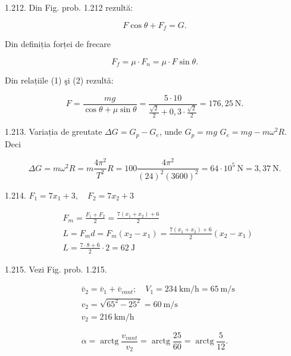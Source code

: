 \documentclass[10pt]{article}
\begin{document}
1.212. Din Fig. prob. 1.212 rezultă:


\begin{equation*}
F \cos \theta+F_{f}=G . \tag{1}
\end{equation*}


Din definiția forței de frecare


\begin{equation*}
F_{f}=\mu \cdot F_{n}=\mu \cdot F \sin \theta . \tag{2}
\end{equation*}


Din relațiile (1) şi (2) rezultă:

$$
F=\frac{m g}{\cos \theta+\mu \sin \theta}=\frac{5 \cdot 10}{\frac{\sqrt{2}}{2}+0,3 \cdot \frac{\sqrt{2}}{2}}=176,25 \mathrm{~N} .
$$

1.213. Variația de greutate $\Delta G=G_{p}-G_{e}$, unde $G_{p}=m g$ $G_{e}=m g-m \omega^{2} R$. Deci

$$
\Delta G=m \omega^{2} R=m \frac{4 \pi^{2}}{T^{2}} R=100 \frac{4 \pi^{2}}{(24)^{2}(3600)^{2}}=64 \cdot 10^{5} \mathrm{~N}=3,37 \mathrm{~N} .
$$

1.214. $F_{1}=7 x_{1}+3, \quad F_{2}=7 x_{2}+3$

$$
\begin{aligned}
& F_{m}=\frac{F_{1}+F_{2}}{2}=\frac{7\left(x_{1}+x_{2}\right)+6}{2} \\
& L=F_{m} d=F_{m}\left(x_{2}-x_{1}\right)=\frac{7\left(x_{1}+x_{2}\right)+6}{2}\left(x_{2}-x_{1}\right) \\
& L=\frac{7 \cdot 8+6}{2} \cdot 2=62 \mathrm{~J}
\end{aligned}
$$

1.215. Vezi Fig. prob. 1.215.

$$
\begin{aligned}
& \bar{v}_{2}=\bar{v}_{1}+\bar{v}_{v a n t} ; \quad V_{1}=234 \mathrm{~km} / \mathrm{h}=65 \mathrm{~m} / \mathrm{s} \\
& v_{2}=\sqrt{65^{2}-25^{2}}=60 \mathrm{~m} / \mathrm{s} \\
& v_{2}=216 \mathrm{~km} / \mathrm{h}
\end{aligned}
$$

$$
\alpha=\operatorname{arctg} \frac{v_{v a n t}}{v_{2}}=\operatorname{arctg} \frac{25}{60}=\operatorname{arctg} \frac{5}{12} .
$$
\end{document}
